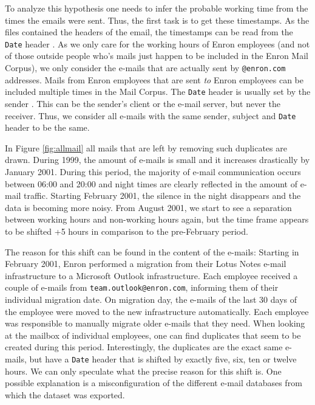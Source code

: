 \documentclass{article}
\begin{document}
To analyze this hypothesis one needs to infer the probable working time from the
times the emails were sent. Thus, the first task is to get these timestamps. As
the files contained the headers of the email, the timestamps can be read from
the \texttt{Date} header \citep{rfc5322}. As we only care for the working hours
of Enron employees (and not of those outside people who's mails just happen to
be included in the Enron Mail Corpus), we only consider the e-mails that are
actually sent by \texttt{@enron.com} addresses. Mails from Enron employees that
are sent \emph{to} Enron employees can be included multiple times in the Mail
Corpus. The \texttt{Date} header is usually set by the sender \citep{rfc2821}.
This can be the sender's client or the e-mail server, but never the receiver.
Thus, we consider all e-mails with the same sender, subject and \texttt{Date}
header to be the same.

In Figure \ref{fig:allmail} all mails that are left by removing such duplicates
are drawn. During 1999, the amount of e-mails is small and it increases
drastically by January 2001. During this period, the majority of e-mail
communication occurs between 06:00 and 20:00 and night times are clearly
reflected in the amount of e-mail traffic. Starting February 2001, the silence
in the night disappears and the data is becoming more noisy. From August 2001,
we start to see a separation between working hours and non-working hours again,
but the time frame appears to be shifted +5 hours in comparison to the
pre-February period.

The reason for this shift can be found in the content of the e-mails: Starting
in February 2001, Enron performed a migration from their Lotus Notes e-mail
infrastructure to a Microsoft Outlook infrastructure. Each employee received a
couple of e-mails from \texttt{team.outlook@enron.com}, informing them of their
individual migration date. On migration day, the e-mails of the last 30 days of
the employee were moved to the new infrastructure automatically. Each employee
was responsible to manually migrate older e-mails that they need. When looking
at the mailbox of individual employees, one can find duplicates that seem to be
created during this period. Interestingly, the duplicates are the exact same
e-mails, but have a \texttt{Date} header that is shifted by exactly five, six,
ten or twelve hours. We can only speculate what the precise reason for this
shift is. One possible explanation is a misconfiguration of the different e-mail
databases from which the dataset was exported.
\end{document}
